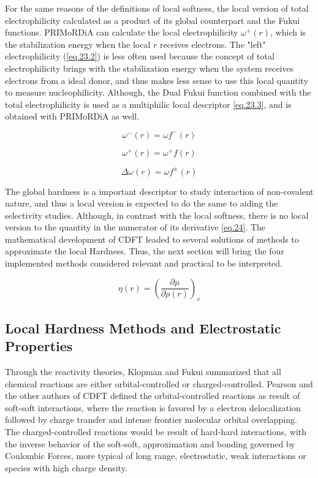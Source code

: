 \documentclass[a4paper,11pt]{refart}
\begin{document}
For the same reasons of the definitions of local softness, the local version of total electrophilicity calculated as a product of its global counterpart and the Fukui functions\cite{noorizadeh2013evaluation}. PRIMoRDiA can calculate the local electrophilicity $\omega^+(r)$, which is the stabilization energy when the local $r$ receives electrons. The "left" electrophilicity (\autoref{eq.23.2}) is less often used because the concept of total electrophilicity brings with the stabilization energy when the system receives electrons from a ideal donor, and thus makes less sense to use this local quantity to measure nucleophilicity. Although, the Dual Fukui function combined with the total electrophilicity is used as a multiphilic local descriptor \autoref{eq.23.3}, and is obtained with PRIMoRDiA as well\cite{padmanabhan2007multiphilic}.  

\begin{equation}
\omega^-(r) = \omega f^-(r)
\label{eq.23.1}
\end{equation}

\begin{equation}
\omega^+(r) = \omega^+ f(r)
\label{eq.23.2}
\end{equation}

\begin{equation}
\Delta \omega(r) = \omega f^{\pm}(r)
\label{eq.23.3}
\end{equation}

The global hardness is a important descriptor to study interaction of non-covalent nature, and thus a local version is expected to do the same to aiding the selectivity studies. Although, in contrast with the local softness, there is no local version to the quantity in the numerator of its derivative \autoref{eq.24}. The mathematical development of CDFT leaded to several solutions of methods to approximate the local Hardness. Thus, the next section will bring the four implemented methods considered relevant and practical to be interpreted. 

\begin{equation}
\eta(r) = \left( \frac{\partial \mu}{\partial \rho(r) } \right)_\nu
\label{eq.24}
\end{equation}

\subsection{Local Hardness Methods and Electrostatic Properties}

Through the reactivity theories, Klopman and Fukui summarized that all chemical reactions are either orbital-controlled or charged-controlled. Pearson and the other authors of CDFT defined the orbital-controlled reactions as result of soft-soft interactions, where the reaction is favored by a electron delocalization followed by charge transfer and intense frontier molecular orbital overlapping. The charged-controlled reactions would be result of hard-hard interactions, with the inverse behavior of the soft-soft, approximation and bonding governed by Coulombic Forces, more typical of long range, electrostatic, weak interactions or species with high charge density. 
\end{document}
